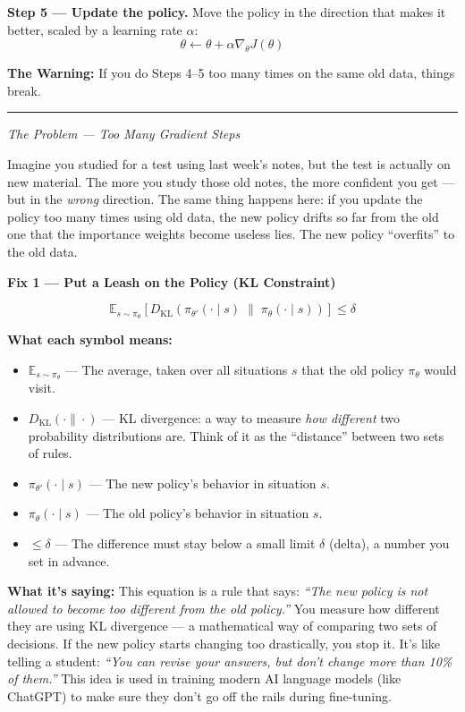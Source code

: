 \bigskip

\textbf{Step 5 --- Update the policy.}
Move the policy in the direction that makes it better, scaled by a learning rate $\alpha$:
\[
\theta \leftarrow \theta + \alpha \nabla_\theta J(\theta)
\]

\textbf{The Warning:} If you do Steps 4--5 too many times on the same old data, things break.

\bigskip
\hrule
\bigskip

\textit{The Problem --- Too Many Gradient Steps}

Imagine you studied for a test using last week's notes, but the test is actually on new material.
The more you study those old notes, the more confident you get --- but in the \textit{wrong} direction.
The same thing happens here: if you update the policy too many times using old data, the new policy
drifts so far from the old one that the importance weights become useless lies.
The new policy ``overfits'' to the old data.

\bigskip

\textbf{Fix 1 --- Put a Leash on the Policy (KL Constraint)}

\[
\mathbb{E}_{s \sim \pi_\theta}
\left[ D_{\mathrm{KL}}\!\left(\pi_{\theta'}(\cdot \mid s) \;\|\; \pi_\theta(\cdot \mid s)\right) \right]
\leq \delta
\]

\textbf{What each symbol means:}
\begin{itemize}
    \item $\mathbb{E}_{s \sim \pi_\theta}$ --- The average, taken over all situations $s$ that the old policy $\pi_\theta$ would visit.
    \item $D_{\mathrm{KL}}(\cdot \| \cdot)$ --- KL divergence: a way to measure \textit{how different} two probability distributions are. Think of it as the ``distance'' between two sets of rules.
    \item $\pi_{\theta'}(\cdot \mid s)$ --- The new policy's behavior in situation $s$.
    \item $\pi_\theta(\cdot \mid s)$ --- The old policy's behavior in situation $s$.
    \item $\leq \delta$ --- The difference must stay below a small limit $\delta$ (delta), a number you set in advance.
\end{itemize}

\textbf{What it's saying:} This equation is a rule that says: \textit{``The new policy is not allowed to become too different from the old policy.''} You measure how different they are using KL divergence --- a mathematical way of comparing two sets of decisions. If the new policy starts changing too drastically, you stop it. It's like telling a student: \textit{``You can revise your answers, but don't change more than 10\% of them.''} This idea is used in training modern AI language models (like ChatGPT) to make sure they don't go off the rails during fine-tuning.

